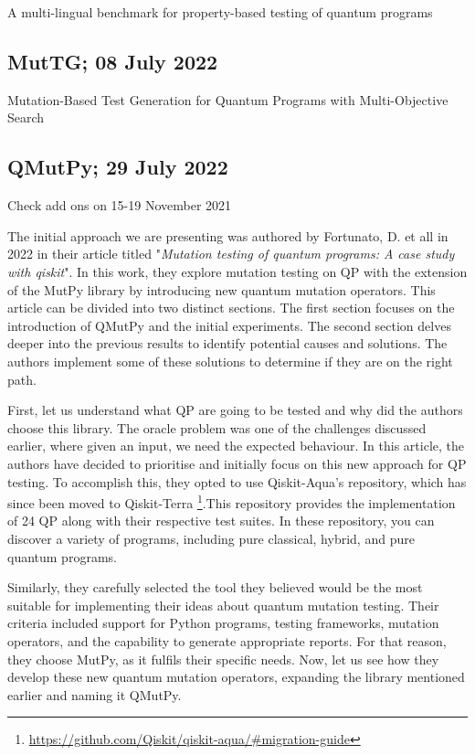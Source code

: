 \begin{itemize}
A multi-lingual benchmark for property-based testing of quantum programs \cite{pontolillo2022multi}

\vspace{15pt}
\subsection{MutTG; 08 July 2022}

Mutation-Based Test Generation for Quantum Programs with Multi-Objective Search \cite{wang2022mutation}

\vspace{15pt}
\subsection{QMutPy; 29 July 2022}
\label{Ch3.2.4:QMutPy}

Check add ons on 15-19 November 2021 \cite{fortunato2022qmutpy}

The initial approach we are presenting was authored by Fortunato, D. et all in 2022 in their article titled "\textit{Mutation testing of quantum programs: A case study with qiskit}"\cite{fortunato2022mutation}. In this work, they explore mutation testing on QP with the extension of the MutPy library by introducing new quantum mutation operators. This article can be divided into two distinct sections. The first section focuses on the introduction of QMutPy and the initial experiments. The second section delves deeper into the previous results to identify potential causes and solutions. The authors implement some of these solutions to determine if they are on the right path. \newline

First, let us understand what QP are going to be tested and why did the authors choose this library. The oracle problem was one of the challenges discussed earlier, where given an input, we need the expected behaviour. In this article, the authors have decided to prioritise and initially focus on this new approach for QP testing. To accomplish this, they opted to use Qiskit-Aqua's repository, which has since been moved to Qiskit-Terra \footnote{\url{https://github.com/Qiskit/qiskit-aqua/\#migration-guide}}.This repository provides the implementation of 24 QP along with their respective test suites. In these repository, you can discover a variety of programs, including pure classical, hybrid, and pure quantum programs.\newline

Similarly, they carefully selected the tool they believed would be the most suitable for implementing their ideas about quantum mutation testing. Their criteria included support for Python programs, testing frameworks, mutation operators, and the capability to generate appropriate reports. For that reason, they choose MutPy, as it fulfils their specific needs. Now, let us see how they develop these new quantum mutation operators, expanding the library mentioned earlier and naming it QMutPy.\newline


\end{itemize}

